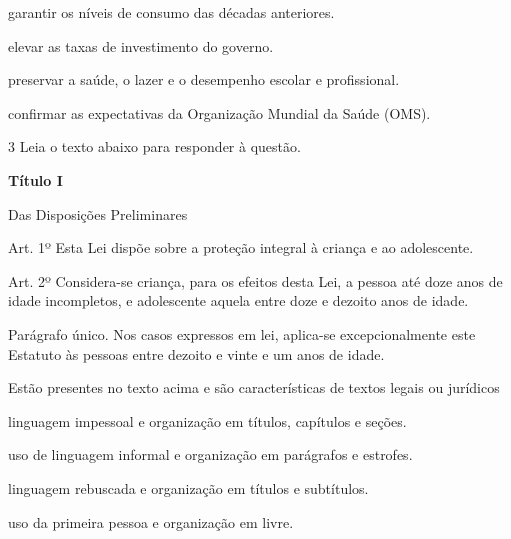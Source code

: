 \begin{escolha}

    \item garantir os níveis de consumo das décadas anteriores. 

    \item elevar as taxas de investimento do governo. 
  
    \item preservar a saúde, o lazer e o desempenho escolar e profissional.
  
    \item confirmar as expectativas da Organização Mundial da Saúde (OMS).

\end{escolha}

\num{3} Leia o texto abaixo para responder à questão. 

\begin{myquote}

\textbf{Título I}

Das Disposições Preliminares

Art. 1º Esta Lei dispõe sobre a proteção integral à criança e ao
adolescente.

Art. 2º Considera-se criança, para os efeitos desta Lei, a pessoa até
doze anos de idade incompletos, e adolescente aquela entre doze e
dezoito anos de idade.

Parágrafo único. Nos casos expressos em lei, aplica-se excepcionalmente
este Estatuto às pessoas entre dezoito e vinte e um anos de idade.


\end{myquote}

Estão presentes no texto acima e são características de textos legais ou
jurídicos

\begin{escolha}

\item linguagem impessoal e organização em títulos, capítulos e seções.
\item uso de linguagem informal e organização em parágrafos e estrofes.
\item linguagem rebuscada e organização em títulos e subtítulos.
\item uso da primeira pessoa e organização em livre.

\end{escolha}

